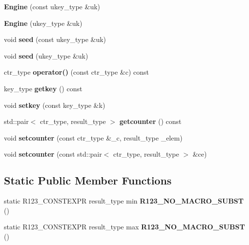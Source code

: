 \begin{DoxyCompactItemize}
{\bfseries Engine} (const ukey\+\_\+type \&uk)
\item 
\hypertarget{structr123_1_1Engine_aeb178b9305cbf1fb7e11e8e33a631ba7}{}\label{structr123_1_1Engine_aeb178b9305cbf1fb7e11e8e33a631ba7} 
{\bfseries Engine} (ukey\+\_\+type \&uk)
\item 
\hypertarget{structr123_1_1Engine_a5c4d68dbbccfc71f467f3c902f5b93da}{}\label{structr123_1_1Engine_a5c4d68dbbccfc71f467f3c902f5b93da} 
void {\bfseries seed} (const ukey\+\_\+type \&uk)
\item 
\hypertarget{structr123_1_1Engine_a7bd6d3417cefb904c879f41d2c29e15e}{}\label{structr123_1_1Engine_a7bd6d3417cefb904c879f41d2c29e15e} 
void {\bfseries seed} (ukey\+\_\+type \&uk)
\item 
\hypertarget{structr123_1_1Engine_a4df4747f3b6129428537f6300e4b94c0}{}\label{structr123_1_1Engine_a4df4747f3b6129428537f6300e4b94c0} 
ctr\+\_\+type {\bfseries operator()} (const ctr\+\_\+type \&c) const
\item 
\hypertarget{structr123_1_1Engine_a807e0d14f7728978c63f4b88b7d1265f}{}\label{structr123_1_1Engine_a807e0d14f7728978c63f4b88b7d1265f} 
key\+\_\+type {\bfseries getkey} () const
\item 
\hypertarget{structr123_1_1Engine_ace8373d1ae2abf7849d4d9a983e63d07}{}\label{structr123_1_1Engine_ace8373d1ae2abf7849d4d9a983e63d07} 
void {\bfseries setkey} (const key\+\_\+type \&k)
\item 
\hypertarget{structr123_1_1Engine_a5e5b1e09ec6d17ad466bcf64293563c8}{}\label{structr123_1_1Engine_a5e5b1e09ec6d17ad466bcf64293563c8} 
std\+::pair$<$ ctr\+\_\+type, result\+\_\+type $>$ {\bfseries getcounter} () const
\item 
\hypertarget{structr123_1_1Engine_af078e04ceae8f975e9749d46a1d061f5}{}\label{structr123_1_1Engine_af078e04ceae8f975e9749d46a1d061f5} 
void {\bfseries setcounter} (const ctr\+\_\+type \&\+\_\+c, result\+\_\+type \+\_\+elem)
\item 
\hypertarget{structr123_1_1Engine_abb13a45ea570e48b1474a40dbcccd445}{}\label{structr123_1_1Engine_abb13a45ea570e48b1474a40dbcccd445} 
void {\bfseries setcounter} (const std\+::pair$<$ ctr\+\_\+type, result\+\_\+type $>$ \&ce)
\end{DoxyCompactItemize}
\subsection*{Static Public Member Functions}
\begin{DoxyCompactItemize}
\item 
\hypertarget{structr123_1_1Engine_af5441fc62932c3d099f8b16150d2aa81}{}\label{structr123_1_1Engine_af5441fc62932c3d099f8b16150d2aa81} 
static R123\+\_\+\+C\+O\+N\+S\+T\+E\+X\+PR result\+\_\+type min {\bfseries R123\+\_\+\+N\+O\+\_\+\+M\+A\+C\+R\+O\+\_\+\+S\+U\+B\+ST} ()
\item 
\hypertarget{structr123_1_1Engine_a112318f7d0015ecf4c3c6a8a5c76371b}{}\label{structr123_1_1Engine_a112318f7d0015ecf4c3c6a8a5c76371b} 
static R123\+\_\+\+C\+O\+N\+S\+T\+E\+X\+PR result\+\_\+type max {\bfseries R123\+\_\+\+N\+O\+\_\+\+M\+A\+C\+R\+O\+\_\+\+S\+U\+B\+ST} ()
\end{DoxyCompactItemize}
